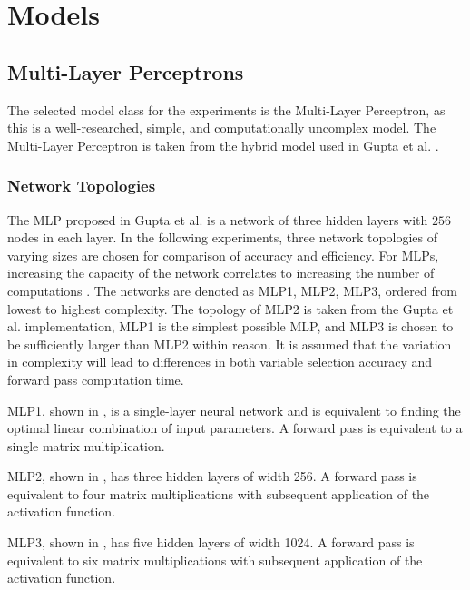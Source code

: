 \section{Models}

\subsection{Multi-Layer Perceptrons}

The selected model class for the experiments is the Multi-Layer Perceptron, as this is a well-researched, simple, and computationally uncomplex model. The Multi-Layer Perceptron is taken from the hybrid model used in Gupta et al. \cite{gupta2020hybrid}.   


\subsubsection{Network Topologies}

The \gls{MLP} proposed in Gupta et al. \cite{gupta2020hybrid} is a network of three hidden layers with $ 256 $ nodes in each layer. In the following experiments, 
three network topologies of varying sizes are chosen for comparison of accuracy and efficiency. 
For MLPs, increasing the capacity of the network correlates to increasing the number of computations \cite{goodfellow2016deep}. The networks are denoted as MLP1, MLP2, MLP3, ordered from lowest to highest complexity. The topology of MLP2 is taken from the Gupta et al. \cite{gupta2020hybrid} implementation, MLP1 is the simplest possible MLP, and MLP3 is chosen to be sufficiently larger than MLP2 within reason. It is assumed that the variation in complexity will lead to differences in both variable selection accuracy and forward pass computation time. 

MLP1, shown in , is a single-layer neural network and is equivalent to finding the optimal linear combination of input parameters. A forward pass is equivalent to a single matrix multiplication. 

MLP2, shown in , has three hidden layers of width 256. A forward pass is equivalent to four matrix multiplications with subsequent application of the activation function.

MLP3, shown in , has five hidden layers of width 1024. A forward pass is equivalent to six matrix multiplications with subsequent application of the activation function.



